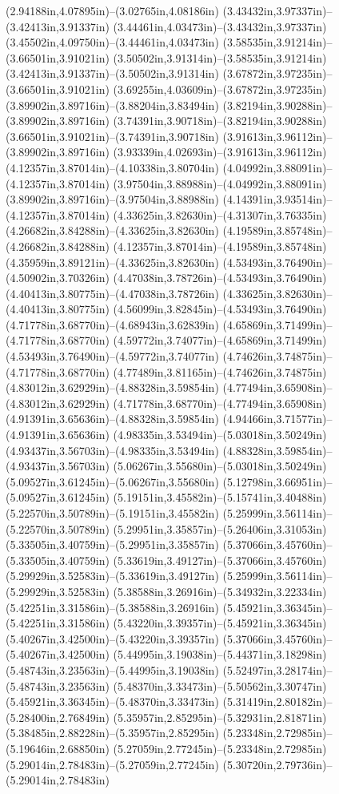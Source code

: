 (2.94188in,4.07895in)--(3.02765in,4.08186in) (3.43432in,3.97337in)--(3.42413in,3.91337in) (3.44461in,4.03473in)--(3.43432in,3.97337in) (3.45502in,4.09750in)--(3.44461in,4.03473in) (3.58535in,3.91214in)--(3.66501in,3.91021in) (3.50502in,3.91314in)--(3.58535in,3.91214in) (3.42413in,3.91337in)--(3.50502in,3.91314in) (3.67872in,3.97235in)--(3.66501in,3.91021in) (3.69255in,4.03609in)--(3.67872in,3.97235in) (3.89902in,3.89716in)--(3.88204in,3.83494in) (3.82194in,3.90288in)--(3.89902in,3.89716in) (3.74391in,3.90718in)--(3.82194in,3.90288in) (3.66501in,3.91021in)--(3.74391in,3.90718in) (3.91613in,3.96112in)--(3.89902in,3.89716in) (3.93339in,4.02693in)--(3.91613in,3.96112in) (4.12357in,3.87014in)--(4.10338in,3.80704in) (4.04992in,3.88091in)--(4.12357in,3.87014in) (3.97504in,3.88988in)--(4.04992in,3.88091in) (3.89902in,3.89716in)--(3.97504in,3.88988in) (4.14391in,3.93514in)--(4.12357in,3.87014in) (4.33625in,3.82630in)--(4.31307in,3.76335in) (4.26682in,3.84288in)--(4.33625in,3.82630in) (4.19589in,3.85748in)--(4.26682in,3.84288in) (4.12357in,3.87014in)--(4.19589in,3.85748in) (4.35959in,3.89121in)--(4.33625in,3.82630in) (4.53493in,3.76490in)--(4.50902in,3.70326in) (4.47038in,3.78726in)--(4.53493in,3.76490in) (4.40413in,3.80775in)--(4.47038in,3.78726in) (4.33625in,3.82630in)--(4.40413in,3.80775in) (4.56099in,3.82845in)--(4.53493in,3.76490in) (4.71778in,3.68770in)--(4.68943in,3.62839in) (4.65869in,3.71499in)--(4.71778in,3.68770in) (4.59772in,3.74077in)--(4.65869in,3.71499in) (4.53493in,3.76490in)--(4.59772in,3.74077in) (4.74626in,3.74875in)--(4.71778in,3.68770in) (4.77489in,3.81165in)--(4.74626in,3.74875in) (4.83012in,3.62929in)--(4.88328in,3.59854in) (4.77494in,3.65908in)--(4.83012in,3.62929in) (4.71778in,3.68770in)--(4.77494in,3.65908in) (4.91391in,3.65636in)--(4.88328in,3.59854in) (4.94466in,3.71577in)--(4.91391in,3.65636in) (4.98335in,3.53494in)--(5.03018in,3.50249in) (4.93437in,3.56703in)--(4.98335in,3.53494in) (4.88328in,3.59854in)--(4.93437in,3.56703in) (5.06267in,3.55680in)--(5.03018in,3.50249in) (5.09527in,3.61245in)--(5.06267in,3.55680in) (5.12798in,3.66951in)--(5.09527in,3.61245in) (5.19151in,3.45582in)--(5.15741in,3.40488in) (5.22570in,3.50789in)--(5.19151in,3.45582in) (5.25999in,3.56114in)--(5.22570in,3.50789in) (5.29951in,3.35857in)--(5.26406in,3.31053in) (5.33505in,3.40759in)--(5.29951in,3.35857in) (5.37066in,3.45760in)--(5.33505in,3.40759in) (5.33619in,3.49127in)--(5.37066in,3.45760in) (5.29929in,3.52583in)--(5.33619in,3.49127in) (5.25999in,3.56114in)--(5.29929in,3.52583in) (5.38588in,3.26916in)--(5.34932in,3.22334in) (5.42251in,3.31586in)--(5.38588in,3.26916in) (5.45921in,3.36345in)--(5.42251in,3.31586in) (5.43220in,3.39357in)--(5.45921in,3.36345in) (5.40267in,3.42500in)--(5.43220in,3.39357in) (5.37066in,3.45760in)--(5.40267in,3.42500in) (5.44995in,3.19038in)--(5.44371in,3.18298in) (5.48743in,3.23563in)--(5.44995in,3.19038in) (5.52497in,3.28174in)--(5.48743in,3.23563in) (5.48370in,3.33473in)--(5.50562in,3.30747in) (5.45921in,3.36345in)--(5.48370in,3.33473in) (5.31419in,2.80182in)--(5.28400in,2.76849in) (5.35957in,2.85295in)--(5.32931in,2.81871in) (5.38485in,2.88228in)--(5.35957in,2.85295in) (5.23348in,2.72985in)--(5.19646in,2.68850in) (5.27059in,2.77245in)--(5.23348in,2.72985in) (5.29014in,2.78483in)--(5.27059in,2.77245in) (5.30720in,2.79736in)--(5.29014in,2.78483in) 